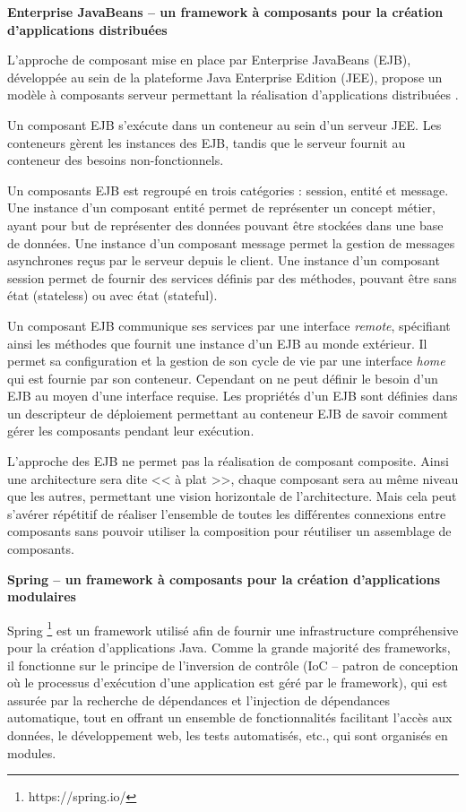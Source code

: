     \textbf{Enterprise JavaBeans -- un framework à composants pour la création d'applications distribuées} 
    
    L'approche de composant mise en place par Enterprise JavaBeans (EJB), développée au sein de la plateforme Java Enterprise Edition (JEE), propose un modèle à composants serveur permettant la réalisation d'applications distribuées \cite{specificationejb}.
    
    Un composant EJB s’exécute dans un conteneur au sein d'un serveur JEE. Les conteneurs gèrent les instances des EJB, tandis que le serveur fournit au conteneur des besoins non-fonctionnels.
    
    Un composants EJB est regroupé en trois catégories : session, entité et message. Une instance d'un composant entité permet de représenter un concept métier, ayant pour but de représenter des données pouvant être stockées dans une base de données. Une instance d'un composant message permet la gestion de messages asynchrones reçus par le serveur depuis le client. Une instance d'un composant session permet de fournir des services définis par des méthodes, pouvant être sans état (stateless) ou avec état (stateful).
    
    Un composant EJB communique ses services par une interface \emph{remote}, spécifiant ainsi les méthodes que fournit une instance d'un EJB au monde extérieur. Il permet sa configuration et la gestion de son cycle de vie par une interface \emph{home} qui est fournie par son conteneur. Cependant on ne peut définir le besoin d'un EJB au moyen d'une interface requise. Les propriétés d'un EJB sont définies dans un descripteur de déploiement permettant au conteneur EJB de savoir comment gérer les composants pendant leur exécution.
    
    L’approche des EJB ne permet pas la réalisation de composant composite. Ainsi une architecture sera dite << à plat >>, chaque composant sera au même niveau que les autres, permettant une vision horizontale de l'architecture. Mais cela peut s’avérer répétitif de réaliser l'ensemble de toutes les différentes connexions entre composants sans pouvoir utiliser la composition pour réutiliser un assemblage de composants. \\\par
    
    \textbf{Spring -- un framework à composants pour la création d'applications modulaires}
    
    Spring \footnote{https://spring.io/} est un framework utilisé afin de fournir une infrastructure compréhensive pour la création d'applications Java. Comme la grande majorité des frameworks, il fonctionne sur le principe de l'inversion de contrôle (IoC -- patron de conception où le processus d’exécution d'une application est géré par le framework), qui est assurée par la recherche de dépendances et l'injection de dépendances automatique, tout en offrant un ensemble de fonctionnalités facilitant l'accès aux données, le développement web, les tests automatisés, etc., qui sont organisés en modules.  
    
